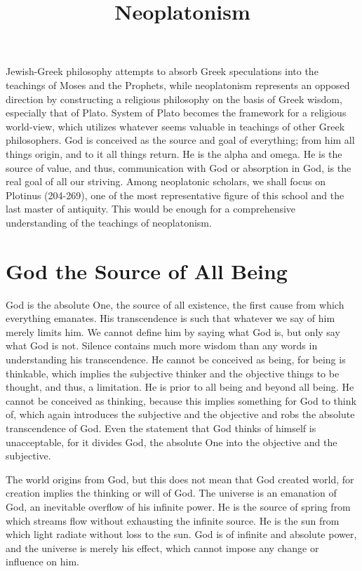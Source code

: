 \documentclass[11pt]{article}
\title{Neoplatonism}
\date{}
\begin{document}
  \maketitle

  \linenumbers

Jewish-Greek philosophy attempts to absorb Greek speculations into the teachings of Moses and the Prophets, while neoplatonism represents an opposed direction by constructing a religious philosophy on the basis of Greek wisdom, especially that of Plato. 
System of Plato becomes the framework for a religious world-view, which utilizes whatever seems valuable in teachings of other Greek philosophers. 
God is conceived as the source and goal of everything; 
from him all things origin, and to it all things return. 
He is the alpha and omega. 
He is the source of value, and thus, communication with God or absorption in God, is the real goal of all our striving. 
Among neoplatonic scholars, we shall focus on Plotinus (204-269), one of the most representative figure of this school and the last master of antiquity. 
This would be enough for a comprehensive understanding of the teachings of neoplatonism.

\section{God the Source of All Being}
God is the absolute One, the source of all existence, the first cause from which everything emanates. 
His transcendence is such that whatever we say of him merely limits him. 
We cannot define him by saying what God is, but only say what God is not. 
Silence contains much more wisdom than any words in understanding his transcendence. 
He cannot be conceived as being, for being is thinkable, which implies the subjective thinker and the objective things to be thought, and thus, a limitation. 
He is prior to all being and beyond all being. 
He cannot be conceived as thinking, because this implies something for God to think of, which again introduces the subjective and the objective and robs the absolute transcendence of God. 
Even the statement that God thinks of himself is unacceptable, 
for it divides God, the absolute One into the objective and the subjective. 

\newline

The world origins from God, but this does not mean that God created world, for creation implies the thinking or will of God. 
The universe is an emanation of God, an inevitable overflow of his infinite power. 
He is the source of spring from which streams flow without exhausting the infinite source. 
He is the sun from which light radiate without loss to the sun. 
God is of infinite and absolute power, and the universe is merely his effect, which cannot impose any change or influence on him.
\end{document}
